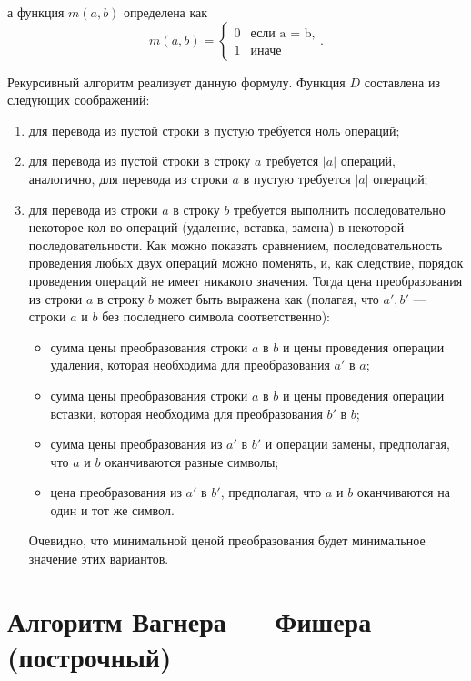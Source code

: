 а функция $m(a, b)$ определена как
\begin{equation}
	m(a, b) = \begin{cases}
		0 &\text{если a = b,}\\
		1 &\text{иначе}
	\end{cases}.
\end{equation}

Рекурсивный алгоритм реализует данную формулу.
Функция $D$ составлена из следующих соображений:
\begin{enumerate}
	\item для перевода из пустой строки в пустую требуется ноль операций;
	\item для перевода из пустой строки в строку $a$ требуется $|a|$ операций, аналогично, для перевода из строки $a$ в пустую требуется $|a|$ операций;
	\item для перевода из строки $a$ в строку $b$ требуется выполнить последовательно некоторое кол-во операций (удаление, вставка, замена) в некоторой последовательности. Как можно показать сравнением, последовательность проведения любых двух операций можно поменять, и, как следствие, порядок проведения операций не имеет никакого значения. Тогда цена преобразования из строки $a$ в строку $b$ может быть выражена как (полагая, что $a', b'$  — строки $a$ и $b$ без последнего символа
	соответственно):
	\begin{itemize}
		\item сумма цены преобразования строки $a$ в $b$ и цены проведения операции удаления, которая необходима для преобразования $a'$ в $a$;
		\item сумма цены преобразования строки $a$ в $b$  и цены проведения операции вставки, которая необходима для преобразования $b'$ в $b$;
		\item сумма цены преобразования из $a'$ в $b'$ и операции замены, предполагая, что $a$ и $b$ оканчиваются разные символы;
		\item цена преобразования из $a'$ в $b'$, предполагая, что $a$ и $b$ оканчиваются на один и тот же символ.
	\end{itemize}
	Очевидно, что минимальной ценой преобразования будет минимальное
	значение этих вариантов.
\end{enumerate}

\section{Алгоритм Вагнера — Фишера (построчный)}

